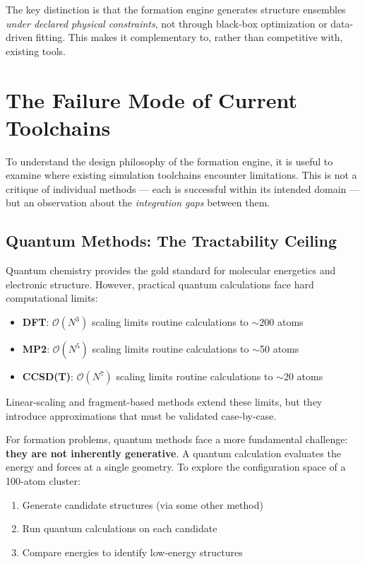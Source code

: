 \documentclass[11pt]{article}
\begin{document}
The key distinction is that the formation engine generates structure ensembles \textit{under declared physical constraints}, not through black-box optimization or data-driven fitting. This makes it complementary to, rather than competitive with, existing tools.

\section{The Failure Mode of Current Toolchains}

To understand the design philosophy of the formation engine, it is useful to examine where existing simulation toolchains encounter limitations. This is not a critique of individual methods — each is successful within its intended domain — but an observation about the \textit{integration gaps} between them.

\subsection{Quantum Methods: The Tractability Ceiling}

Quantum chemistry provides the gold standard for molecular energetics and electronic structure. However, practical quantum calculations face hard computational limits:

\begin{itemize}
\item \textbf{DFT}: $\mathcal{O}(N^3)$ scaling limits routine calculations to $\sim$200 atoms
\item \textbf{MP2}: $\mathcal{O}(N^5)$ scaling limits routine calculations to $\sim$50 atoms  
\item \textbf{CCSD(T)}: $\mathcal{O}(N^7)$ scaling limits routine calculations to $\sim$20 atoms
\end{itemize}

Linear-scaling and fragment-based methods extend these limits, but they introduce approximations that must be validated case-by-case.

For formation problems, quantum methods face a more fundamental challenge: \textbf{they are not inherently generative}. A quantum calculation evaluates the energy and forces at a single geometry. To explore the configuration space of a 100-atom cluster:

\begin{enumerate}
\item Generate candidate structures (via some other method)
\item Run quantum calculations on each candidate
\item Compare energies to identify low-energy structures
\end{enumerate}
\end{document}
